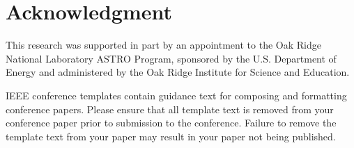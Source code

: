 \documentclass[conference]{IEEEtran}
\begin{document}
\section*{Acknowledgment}
 This research was supported in part by an appointment to the Oak Ridge National Laboratory ASTRO Program, sponsored by the U.S. Department of Energy and administered by the Oak Ridge Institute for Science and Education.





\vspace{12pt}
\color{red}
IEEE conference templates contain guidance text for composing and formatting conference papers. Please ensure that all template text is removed from your conference paper prior to submission to the conference. Failure to remove the template text from your paper may result in your paper not being published.
\end{document}
